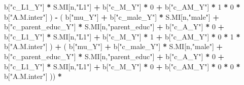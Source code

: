 \documentclass[
]{book}
\newenvironment{Shaded}{\begin{snugshade}}{\end{snugshade}}
\newcommand{\DecValTok}[1]{\textcolor[rgb]{0.00,0.00,0.81}{#1}}
\newcommand{\NormalTok}[1]{#1}
\newcommand{\SpecialCharTok}[1]{\textcolor[rgb]{0.81,0.36,0.00}{\textbf{#1}}}
\newcommand{\StringTok}[1]{\textcolor[rgb]{0.31,0.60,0.02}{#1}}
\begin{document}
\begin{Shaded}
\begin{Highlighting}[]
\NormalTok{                                b[}\StringTok{"c\_L1\_Y"}\NormalTok{] }\SpecialCharTok{*}\NormalTok{ S.MI[n,}\StringTok{"L1"}\NormalTok{] }\SpecialCharTok{+}
\NormalTok{                                b[}\StringTok{"c\_M\_Y"}\NormalTok{] }\SpecialCharTok{*} \DecValTok{0} \SpecialCharTok{+}
\NormalTok{                                b[}\StringTok{"c\_AM\_Y"}\NormalTok{] }\SpecialCharTok{*} \DecValTok{1} \SpecialCharTok{*} \DecValTok{0} \SpecialCharTok{*}\NormalTok{ b[}\StringTok{"A.M.inter"}\NormalTok{] ) }\SpecialCharTok{{-}} 
\NormalTok{                            ( b[}\StringTok{"mu\_Y"}\NormalTok{] }\SpecialCharTok{+} 
\NormalTok{                                b[}\StringTok{"c\_male\_Y"}\NormalTok{] }\SpecialCharTok{*}\NormalTok{ S.MI[n,}\StringTok{"male"}\NormalTok{] }\SpecialCharTok{+} 
\NormalTok{                                b[}\StringTok{"c\_parent\_educ\_Y"}\NormalTok{] }\SpecialCharTok{*}\NormalTok{ S.MI[n,}\StringTok{"parent\_educ"}\NormalTok{] }\SpecialCharTok{+} 
\NormalTok{                                b[}\StringTok{"c\_A\_Y"}\NormalTok{] }\SpecialCharTok{*} \DecValTok{0} \SpecialCharTok{+} 
\NormalTok{                                b[}\StringTok{"c\_L1\_Y"}\NormalTok{] }\SpecialCharTok{*}\NormalTok{ S.MI[n,}\StringTok{"L1"}\NormalTok{] }\SpecialCharTok{+}
\NormalTok{                                b[}\StringTok{"c\_M\_Y"}\NormalTok{] }\SpecialCharTok{*} \DecValTok{1} \SpecialCharTok{+}
\NormalTok{                                b[}\StringTok{"c\_AM\_Y"}\NormalTok{] }\SpecialCharTok{*} \DecValTok{0} \SpecialCharTok{*} \DecValTok{1} \SpecialCharTok{*}\NormalTok{ b[}\StringTok{"A.M.inter"}\NormalTok{] ) }\SpecialCharTok{+} 
\NormalTok{                            ( b[}\StringTok{"mu\_Y"}\NormalTok{] }\SpecialCharTok{+} 
\NormalTok{                                b[}\StringTok{"c\_male\_Y"}\NormalTok{] }\SpecialCharTok{*}\NormalTok{ S.MI[n,}\StringTok{"male"}\NormalTok{] }\SpecialCharTok{+} 
\NormalTok{                                b[}\StringTok{"c\_parent\_educ\_Y"}\NormalTok{] }\SpecialCharTok{*}\NormalTok{ S.MI[n,}\StringTok{"parent\_educ"}\NormalTok{] }\SpecialCharTok{+} 
\NormalTok{                                b[}\StringTok{"c\_A\_Y"}\NormalTok{] }\SpecialCharTok{*} \DecValTok{0} \SpecialCharTok{+} 
\NormalTok{                                b[}\StringTok{"c\_L1\_Y"}\NormalTok{] }\SpecialCharTok{*}\NormalTok{ S.MI[n,}\StringTok{"L1"}\NormalTok{] }\SpecialCharTok{+}
\NormalTok{                                b[}\StringTok{"c\_M\_Y"}\NormalTok{] }\SpecialCharTok{*} \DecValTok{0} \SpecialCharTok{+}
\NormalTok{                                b[}\StringTok{"c\_AM\_Y"}\NormalTok{] }\SpecialCharTok{*} \DecValTok{0} \SpecialCharTok{*} \DecValTok{0} \SpecialCharTok{*}\NormalTok{ b[}\StringTok{"A.M.inter"}\NormalTok{] )) }\SpecialCharTok{*}

\end{Highlighting}
\end{Shaded}
\end{document}
